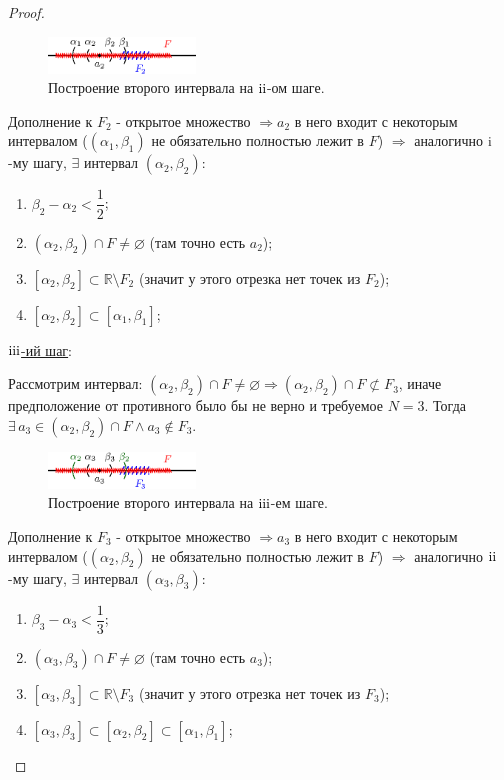 \documentclass[12pt]{article}
\newcommand{\RN}[1]{%
	\textup{\uppercase\expandafter{\romannumeral#1}}%
}
\theoremstyle{definition}
\begin{document}
\begin{proof}
	\begin{figure}[H]
		\centering
		\includegraphics[width=0.35\textwidth]{13_3.eps}
		\caption{Построение второго интервала на $\RN{2}$-ом шаге.}
		\label{13_3}
	\end{figure}
	
	Дополнение к $F_2$ - открытое множество $\Rightarrow a_2$ в него входит с некоторым интервалом ($(\alpha_1, \beta_1)$ не обязательно полностью лежит в $F$) $\Rightarrow$ аналогично $\RN{1}$-му шагу, $\exists$ интервал $(\alpha_2, \beta_2)$:
	\begin{enumerate}[label={\arabic*)}]
		\item $\beta_2 - \alpha_2 < \dfrac{1}{2}$;
		\item $(\alpha_2, \beta_2) \cap F \neq \varnothing$ (там точно есть $a_2$);
		\item $[\alpha_2, \beta_2] \subset \mathbb{R} \setminus F_2$ (значит у этого отрезка нет точек из $F_2$);
		\item $[\alpha_2,\beta_2] \subset [\alpha_1, \beta_1]$;
	\end{enumerate}

	\uline{$\RN{3}$-ий шаг}:
	
	Рассмотрим интервал: $(\alpha_2, \beta_2) \cap F \neq \varnothing \Rightarrow (\alpha_2, \beta_2) \cap F \not\subset F_3$, иначе предположение от противного было бы не верно и требуемое $N = 3$. 
	Тогда $\exists \, a_3 \in (\alpha_2,\beta_2) \cap F \wedge a_3 \notin F_3$. 
	
	\begin{figure}[H]
		\centering
		\includegraphics[width=0.35\textwidth]{13_4.eps}
		\caption{Построение второго интервала на $\RN{3}$-ем шаге.}
		\label{13_4}
	\end{figure}
	
	Дополнение к $F_3$ - открытое множество $\Rightarrow a_3$ в него входит с некоторым интервалом ($(\alpha_2, \beta_2)$ не обязательно полностью лежит в $F$) $\Rightarrow$ аналогично $\RN{2}$-му шагу, $\exists$ интервал $(\alpha_3, \beta_3)$:
	\begin{enumerate}[label={\arabic*)}]
		\item $\beta_3 - \alpha_3 < \dfrac{1}{3}$;
		\item $(\alpha_3, \beta_3) \cap F \neq \varnothing$ (там точно есть $a_3$);
		\item $[\alpha_3, \beta_3] \subset \mathbb{R} \setminus F_3$ (значит у этого отрезка нет точек из $F_3$);
		\item $[\alpha_3,\beta_3] \subset [\alpha_2,\beta_2] \subset [\alpha_1, \beta_1]$;
	\end{enumerate}
	

\end{proof}
\end{document}
